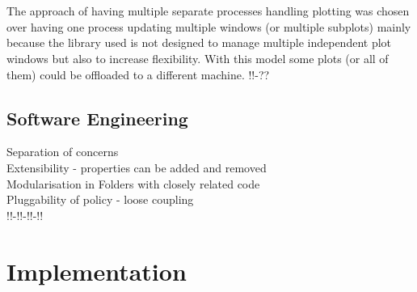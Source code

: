 \documentclass{l4proj}
\begin{document}
\\\\
\hspace*{3em} The approach of having multiple separate processes handling plotting was chosen over having one process updating multiple windows (or multiple subplots) mainly because the library used is not designed to manage multiple independent plot windows but also to increase flexibility. With this model some plots (or all of them) could be offloaded to a different machine. !!-??  
\section{Software Engineering}
Separation of concerns\\
Extensibility - properties can be added and removed\\
Modularisation in Folders with closely related code\\
Pluggability of policy - loose coupling\\
!!-!!-!!-!!
\newpage
\chapter{Implementation}
\end{document}
